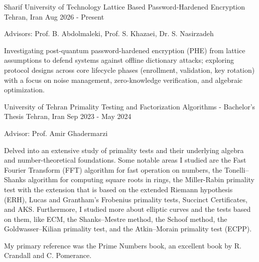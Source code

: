 \vspace{-15pt}

\begin{cventries}
  \vspace{-5pt}
  \cventry
  {Sharif University of Technology}
  {Lattice Based Password-Hardened Encryption}
  {Tehran, Iran}
  {Aug 2026 - Present}
  {
    \begin{cvitems}
      \item Advisors: Prof. B. Abdolmaleki, Prof. S. Khazaei, Dr. S. Nasirzadeh
      \hfill {}
      \item {Investigating post-quantum password-hardened encryption (PHE) from lattice assumptions to defend systems against offline dictionary attacks; exploring protocol designs across core lifecycle phases (enrollment, validation, key rotation) with a focus on noise management, zero-knowledge verification, and algebraic optimization.}
    \end{cvitems}
  }

  \cventry
  {University of Tehran}
  {Primality Testing and Factorization Algorithms - Bachelor's Thesis}
  {Tehran, Iran}
  {Sep 2023 - May 2024}
  {
    \begin{cvitems}
      \item Advisor: Prof. Amir Ghadermarzi
      \hfill
      \item Delved into an extensive study of primality tests and their underlying algebra and number-theoretical foundations. Some notable areas I studied are the Fast Fourier Transform (FFT) algorithm for fast operation on numbers, the Tonelli–Shanks algorithm for computing square roots in rings, the Miller-Rabin primality test with the extension that is based on the extended Riemann hypothesis (ERH), Lucas and Grantham's Frobenius primality tests, Succinct Certificates, and AKS. Furthermore, I studied more about elliptic curves and the tests based on them, like ECM, the Shanks–Mestre method, the Schoof method, the Goldwasser–Kilian primality test, and the Atkin–Morain primality test (ECPP).
      \item My primary reference was the Prime Numbers book, an excellent book by R. Crandall and C. Pomerance.
    \end{cvitems}
  }


\end{cventries}
